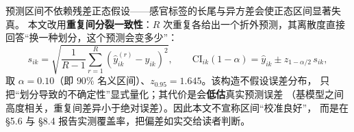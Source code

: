 预测区间不依赖残差正态假设——感官标签的长尾与异方差会使正态区间显著失真。
本文改用\textbf{重复间分裂一致性}：$R$ 次重复各给出一个折外预测，其离散度直接
回答“换一种划分，这个预测会变多少”：
\begin{equation}
s_{ik}=\sqrt{\frac{1}{R-1}\sum_{r=1}^{R}
\left(\hat y^{(r)}_{ik}-\hat y_{ik}\right)^{2}},\qquad
\mathrm{CI}_{ik}(1-\alpha)=\hat y_{ik}\pm z_{1-\alpha/2}\,s_{ik},
\label{eq:pi}
\end{equation}
取 $\alpha=0.10$（即 $90\%$ 名义区间）、$z_{0.95}=1.645$。该构造不假设误差分布，
只把“划分导致的不确定性”显式量化；其代价是会\textbf{低估}真实预测误差
（基模型之间高度相关，重复间差异小于绝对误差）。因此本文不宣称区间“校准良好”，
而是在 \S5.6 与 \S8.4 报告实测覆盖率，把偏差如实交给读者判断。
